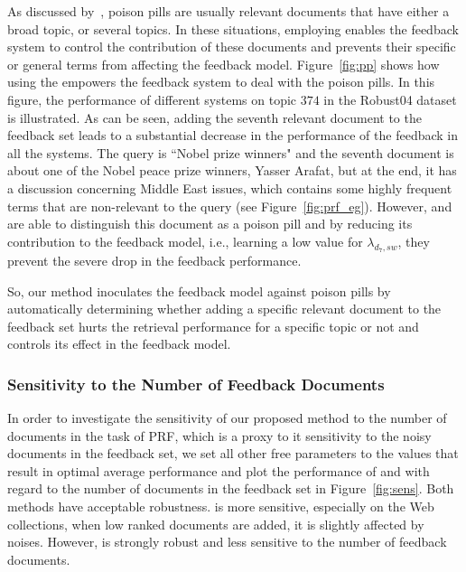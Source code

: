 As discussed by~\citet{Terra:2005}, poison pills are usually relevant documents that have either a broad topic, or several topics. In these situations, employing \swlms  enables the feedback system to control the contribution of these documents and prevents their specific or general terms from affecting the feedback model. Figure~\ref{fig:pp} shows how using the \swlm  empowers the feedback system to deal with the poison pills. In this figure, the performance of different systems on topic $374$ in the Robust04 dataset is illustrated. As can be seen, adding the seventh relevant document to the feedback set leads to a substantial decrease in the performance of the feedback in all the systems. The query is ``Nobel prize winners" and the seventh document is about one of the Nobel peace prize winners, Yasser Arafat, but at the end, it has a discussion concerning Middle East issues, which contains some highly frequent terms that are non-relevant to the query (see Figure~\ref{fig:prf_eg}).  
However, \acrswlm  and \acswlm  are able to distinguish this document as a poison pill and by reducing its contribution to the feedback model, i.e., learning a low value for $\lambda_{d_7,sw}$, they prevent the severe drop in the feedback performance. 

So, our method inoculates the feedback model against poison pills by automatically determining whether adding a specific relevant document to the feedback set hurts the retrieval performance for a specific topic or not and controls its effect in the feedback model.


\subsubsection{Sensitivity to the Number of Feedback Documents}

In order to investigate the sensitivity of our proposed method to the number of documents in the task of PRF, which is a proxy to it sensitivity to the noisy documents in the feedback set, we set all other free parameters to the values that result in optimal average performance and  plot the performance of \acswlm  and \acrswlm  with regard to the number of documents in the feedback set in Figure~\ref{fig:sens}. Both methods have acceptable robustness. 
\acswlm  is more sensitive, especially on the Web collections, when low ranked documents are added, it is slightly affected by noises.  However, \acrswlm  is strongly robust and less sensitive to the number of feedback documents.


